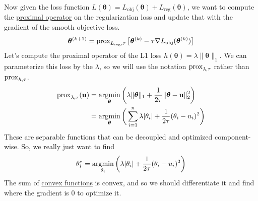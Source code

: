   Now given the loss function $L (\boldsymbol{\theta}) = L_{\mathrm{obj}} (\boldsymbol{\theta}) + L_{\mathrm{reg}} (\boldsymbol{\theta})$, we want to compute the \hyperref[def:proximal-operator]{proximal operator} on the regularization loss and update that with the gradient of the smooth objective loss. 
  \begin{equation}
    \boldsymbol{\theta}^{(k+1)} = \operatorname{prox}_{L_{\mathrm{reg}}, \tau} \big[ \boldsymbol{\theta}^{(k)} - \tau \nabla L_{\mathrm{obj}} (\boldsymbol{\theta}^{(k)}) \big]
  \end{equation}
  Let's compute the proximal operator of the L1 loss $h(\boldsymbol{\theta}) = \lambda \|\boldsymbol{\theta}\|_1$. We can parameterize this loss by the $\lambda$, so we will use the notation $\operatorname{prox}_{\lambda, \tau}$ rather than $\operatorname{prox}_{h, \tau}$. 
  \begin{align*}
    \operatorname{prox}_{\lambda, \tau} (\mathbf{u}) & = \operatorname*{\arg\!\min}_{\boldsymbol{\theta}} \bigg( \lambda \|\boldsymbol{\theta}\|_1 + \frac{1}{2\tau} \|\boldsymbol{\theta} - \mathbf{u}\|_2^2 \bigg) \\
    & = \operatorname*{\arg\!\min}_{\boldsymbol{\theta}} \bigg( \sum_{i=1}^n \lambda |\theta_i| + \frac{1}{2\tau} (\theta_i - u_i)^2 \bigg) 
  \end{align*}
  These are separable functions that can be decoupled and optimized component-wise. So, we really just want to find 
  \begin{equation}
    \theta_i^\ast = \operatorname*{\arg\!\min}_{\theta_i} \bigg( \lambda |\theta_i| + \frac{1}{2\tau} (\theta_i - u_i)^2 \bigg)
  \end{equation}
  The sum of \hyperref[mt-def:convex-function]{convex functions} is convex, and so we should differentiate it and find where the gradient is $0$ to optimize it. 
